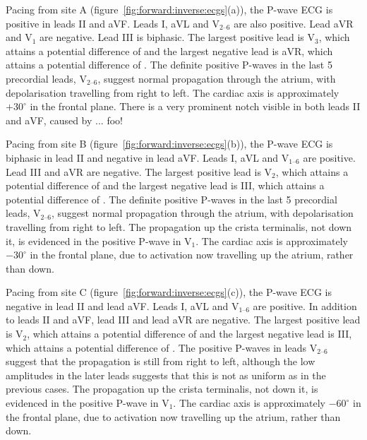 Pacing from site A (figure~\ref{fig:forward:inverse:ecgs}(a)), the P-wave ECG is
positive in leads II and  aVF.
Leads I, aVL and $\text{V}_{\text{2--6}}$ are also positive.
Lead aVR and $\text{V}_{\text{1}}$ are negative.
Lead III is biphasic.
The largest positive lead is $\text{V}_{\text{3}}$, which attains a potential
difference of  and the largest negative lead is aVR,
which attains a potential difference of .
The definite positive P-waves in the last 5 precordial leads,
$\text{V}_{\text{2--6}}$, suggest normal propagation through the atrium, with
depolarisation travelling from right to left.
The cardiac axis is approximately $+30^\circ$ in the frontal plane.
There is a very prominent notch visible in both leads II and aVF, caused by ...
foo!

Pacing from site B (figure~\ref{fig:forward:inverse:ecgs}(b)), the P-wave ECG is
biphasic in lead II and negative in lead aVF.
Leads I, aVL and $\text{V}_{\text{1--6}}$ are positive.
Lead III and aVR are negative.
The largest positive lead is $\text{V}_{\text{2}}$, which attains a potential
difference of  and the largest negative lead is III,
which attains a potential difference of .
The definite positive P-waves in the last 5 precordial leads,
$\text{V}_{\text{2--6}}$, suggest normal propagation through the atrium, with
depolarisation travelling from right to left.
The propagation up the crista terminalis, not down it, is evidenced in the
positive P-wave in $\text{V}_{\text{1}}$.
The cardiac axis is approximately $-30^\circ$ in the frontal plane, due to
activation now travelling up the atrium, rather than down.


Pacing from site C (figure~\ref{fig:forward:inverse:ecgs}(c)), the P-wave ECG is
negative in lead II and lead aVF.
Leads I, aVL and $\text{V}_{\text{1--6}}$ are positive.
In addition to leads II and aVF, lead III and lead aVR are negative.
The largest positive lead is $\text{V}_{\text{2}}$, which attains a potential
difference of  and the largest negative lead is III,
which attains a potential difference of .
The positive P-waves in leads $\text{V}_{\text{2--6}}$ suggest that the
propagation is still from right to left, although the low amplitudes in the
later leads suggests that this is not as uniform as in the previous cases.
The propagation up the crista terminalis, not down it, is evidenced in the
positive P-wave in $\text{V}_{\text{1}}$.
The cardiac axis is approximately $-60^\circ$ in the frontal plane, due to
activation now travelling up the atrium, rather than down.


